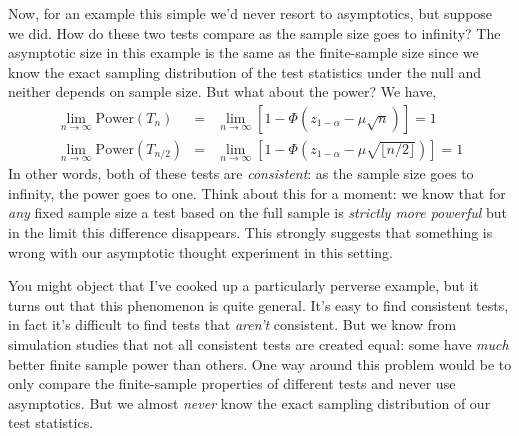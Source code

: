 \documentclass[12pt]{article}
\theoremstyle{definition}
\begin{document}
Now, for an example this simple we'd never resort to asymptotics, but suppose we did. 
How do these two tests compare as the sample size goes to infinity? 
The asymptotic size in this example is the same as the finite-sample size since we know the exact sampling distribution of the test statistics under the null and neither depends on sample size. 
But what about the power? 
We have,
\begin{eqnarray*}
\lim_{n\rightarrow \infty} \mbox{Power}(T_{n}) &=& \lim_{n\rightarrow \infty}\left[1 - \Phi\left(z_{1-\alpha} - \mu\sqrt{n}\right) \right] = 1\\
\lim_{n\rightarrow \infty} \mbox{Power}(T_{n/2}) &=& \lim_{n\rightarrow \infty}\left[1 - \Phi\left(z_{1-\alpha} - \mu\sqrt{\lfloor n/2 \rfloor }\right) \right] = 1
\end{eqnarray*}
In other words, both of these tests are \emph{consistent}: as the sample size goes to infinity, the power goes to one. 
Think about this for a moment: we know that for \emph{any} fixed sample size a test based on the full sample is \emph{strictly more powerful} but in the limit this difference disappears. 
This strongly suggests that something is wrong with our asymptotic thought experiment in this setting.

You might object that I've cooked up a particularly perverse example, but it turns out that this phenomenon is quite general. 
It's easy to find consistent tests, in fact it's difficult to find tests that \emph{aren't} consistent. 
But we know from simulation studies that not all consistent tests are created equal: some have \emph{much} better finite sample power than others. 
One way around this problem would be to only compare the finite-sample properties of different tests and never use asymptotics. 
But we almost \emph{never} know the exact sampling distribution of our test statistics.
\end{document}

